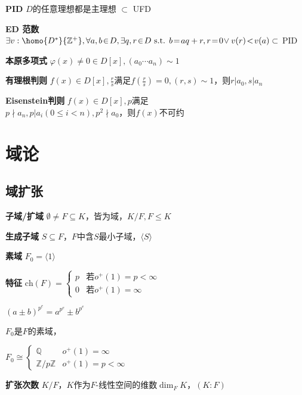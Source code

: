 \documentclass[b4paper, 10pt]{ctexart}
\newcommand*{\setZ}{\mathbb{Z}}
\newcommand*{\setQ}{\mathbb{Q}}
\newcommand*{\st}{\text{ s.t. }}
\renewcommand*{\leq}{\leqslant}
\newcommand*{\genfield}[1]{\langle #1 \rangle}
\newcommand*{\ch}[1]{\text{ch}(#1)}
\begin{document}
\begin{multicols}{3}
    \textbf{PID} $D$的任意理想都是主理想 $\subset$ UFD

    \textbf{ED 范数} $\exists v: \homo{D^*}{\setZ^+}, \forall a, b \!\in\! D, \exists q, r \!\in\! D \st b \! = \! aq + r, r \! = \! 0 \!\vee v(r) \!<\! v(a) \subset$ PID

    \textbf{本原多项式} $\varphi(x) \!\ne\! 0 \!\in\! D[x], (a_0 \cdots a_n) \sim 1$

    \textbf{有理根判则} $f(x) \in D[x], \frac{r}{s}$满足$f(\frac{r}{s}) = 0, (r, s) \sim 1$，则$r | a_0, s | a_n$

    \textbf{Eisenstein判则} $f(x) \!\in\! D[x], p$满足\\
    $p \!\nmid\! a_n, p | a_i (0 \!\leq\! i \!<\! n), p^2 \nmid a_0$，则$f(x)$不可约

    \section{域论}

    \subsection{域扩张}

    \textbf{子域/扩域} $\emptyset \ne F \subseteq K$，皆为域，$K/F, F \leq K$

    \textbf{生成子域} $S \subseteq F$，$F$中含$S$最小子域，$\genfield{S}$

    \textbf{素域} $F_0 = \genfield{1}$

    \textbf{特征} $\ch{F} = \begin{cases}
            p & \text{若}o^+(1) = p < \infty \\
            0 & \text{若}o^+(1) = \infty
        \end{cases}$

    $(a \pm b)^{p^e} = a^{p^e} \pm b^{p^e}$

    \begin{theorem}[素域同构]
        $F_0$是$F$的素域，

        $F_0 \cong \begin{cases}
                \setQ        & o^+(1) = \infty     \\
                \setZ/p\setZ & o^+(1) = p < \infty
            \end{cases}$
    \end{theorem}

    \textbf{扩张次数} $K/F$，$K$作为$F$-线性空间的维数$\dim_F K$，$(K:F)$


\end{multicols}
\end{document}
